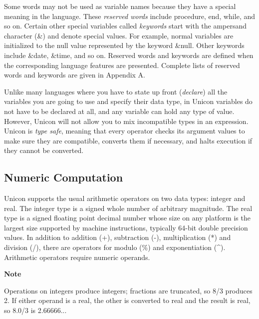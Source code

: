 Some words may not be used as variable names because they have a special
meaning in the language. These \textit{reserved
word}\textit{s} include \textsf{procedure}, \textsf{end},
\textsf{while}, and so on. Certain other special variables called
\textit{keyword}\textit{s} start with the ampersand
character (\textsf{\&}) and denote special values. For example, normal
variables are initialized to the null value represented by the keyword
\textsf{\&}\textsf{null}. Other keywords
include \textsf{\&date}\textsf{, }\textsf{\&time}\textsf{,} and so on.
Reserved words and keywords are defined when the corresponding language
features are presented. Complete lists of reserved words and keywords
are given in Appendix A.

Unlike many languages where you have to state up front
(\textit{declare}) all the variables you are going to use\textit{ }and
specify their data type, in Unicon variables do not have to be declared
at all, and any variable can hold any type of value. However, Unicon
will not allow you to mix incompatible types in an expression. Unicon
is \textit{type safe}, meaning that every operator
checks its argument values to make sure they are compatible, converts
them if necessary, and halts execution if they cannot be converted.

\subsection[Numeric Computation]{Numeric Computation}
Unicon supports the usual arithmetic operators on two
data types: integer and real. The integer type is a
signed whole number of arbitrary magnitude. The real type is a signed
floating point decimal number whose size on any
platform is the largest size supported by machine instructions,
typically 64-bit double precision values. In addition to
addition (\textsf{+}), subtraction
(\textsf{{}-}), multiplication (\textsf{*}) and
division (\textsf{/}), there are operators for
modulo (\textsf{\%}) and exponentiation (\textsf{\^{}}). Arithmetic operators require
numeric operands.

{\sffamily\bfseries
Note}

{\sffamily
Operations on integers produce integers; fractions are truncated, so 8/3
produces 2. If either operand is a real, the other is converted to real
and the result is real, so 8.0/3 is 2.66666...}

